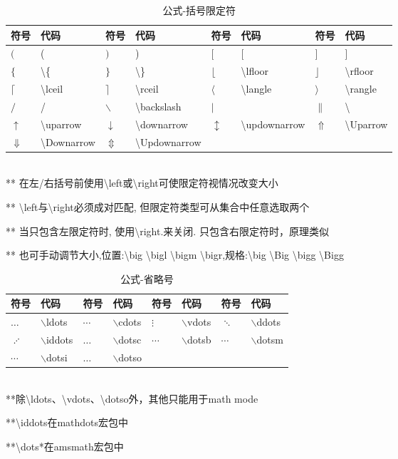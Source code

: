 \documentclass[UTF8,fontset=ubuntu]{ctexbook}
\begin{document}
\begin{table}[H]
\begin{tabular}{l l l l l l l l}
	\hline
	符号 & 代码 & 符号 & 代码 & 符号 & 代码 & 符号 & 代码\\
	\hline
	$($ & ( & $)$ & ) & $[$ & [ & $]$ & ]\\
	$\{$ & \textbackslash \{ & $\}$ & \textbackslash \} & $\lfloor$ & \textbackslash lfloor & $\rfloor$ & \textbackslash rfloor\\
	$\lceil$ & \textbackslash lceil & $\rceil$ & \textbackslash rceil & $\langle$ & \textbackslash langle & $\rangle$ & \textbackslash rangle\\
	$/$ & / & $\backslash$ & \textbackslash backslash & $|$ & \textbar & $\|$ & \textbackslash\textbar\\
	$\uparrow$ & \textbackslash uparrow & $\downarrow$ & \textbackslash downarrow & $\updownarrow$ & \textbackslash updownarrow & $\Uparrow$ & \textbackslash Uparrow\\
	$\Downarrow$ & \textbackslash Downarrow & $\Updownarrow$ & \textbackslash Updownarrow\\
	\hline
\end{tabular}\\[2mm]
** 在左/右括号前使用\textbackslash left或\textbackslash right可使限定符视情况改变大小\par
** \textbackslash left与\textbackslash right必须成对匹配, 但限定符类型可从集合中任意选取两个\par
** 当只包含左限定符时, 使用\textbackslash right.来关闭. 只包含右限定符时，原理类似\par
** 也可手动调节大小,位置:\textbackslash big \textbackslash bigl \textbackslash bigm \textbackslash bigr,规格:\textbackslash big \textbackslash Big \textbackslash bigg \textbackslash Bigg
\caption{公式-括号限定符}
\end{table}

\begin{table}[H]
\begin{tabular}{l l l l l l l l}
	\hline
	符号 & 代码 & 符号 & 代码 & 符号 & 代码 & 符号 & 代码\\
	\hline
	$\ldots$ & $\backslash$ldots & $\cdots$ & $\backslash$cdots & $\vdots$ & $\backslash$vdots & $\ddots$ & $\backslash$ddots\\
	$\iddots$ & $\backslash$iddots & $\dotsc$ & $\backslash$dotsc & $\dotsb$ & $\backslash$dotsb & $\dotsm$ & $\backslash$dotsm\\
	$\dotsi$ & $\backslash$dotsi & $\dotso$ & $\backslash$dotso\\
	\hline
\end{tabular}\\[2mm]
\RaggedRight
**除\textbackslash ldots、\textbackslash vdots、\textbackslash dotso外，其他只能用于math mode\par
**\textbackslash iddots在mathdots宏包中\par
**\textbackslash dots*在amsmath宏包中
\caption{公式-省略号}
\end{table}
\end{document}
